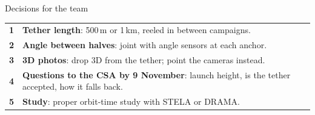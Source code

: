 \documentclass[aspectratio=169,11pt]{beamer}
\begin{document}
\begin{frame}{Decisions for the team}
\renewcommand{\arraystretch}{1.6}
\begin{tabular}{@{}>{\bfseries}l p{12.3cm}@{}}
1 & \textbf{Tether length}: 500\,m or 1\,km, reeled in between campaigns. \\
2 & \textbf{Angle between halves}: joint with angle sensors at each anchor. \\
3 & \textbf{3D photos}: drop 3D from the tether; point the cameras instead. \\
4 & \textbf{Questions to the CSA by 9 November}: launch height, is the tether accepted, how it falls back. \\
5 & \textbf{Study}: proper orbit-time study with STELA or DRAMA. \\
\end{tabular}
\end{frame}
\end{document}
